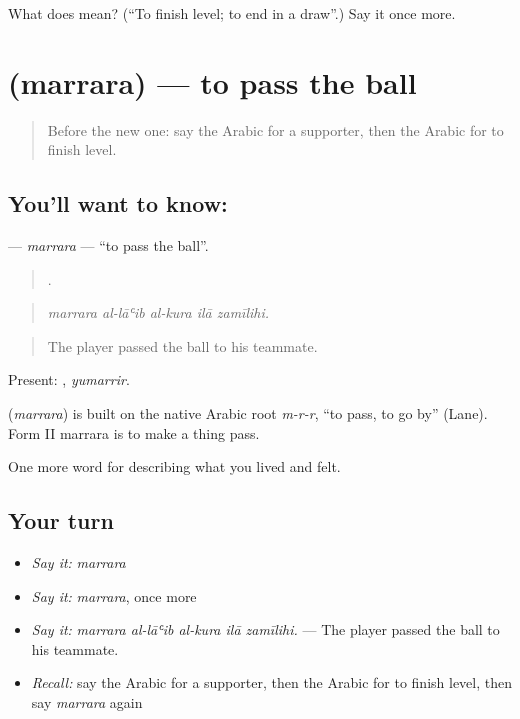 \begin{tcolorbox}[breakable,colback=teal!4,colframe=teal!35!black,title={Before you move on}]
What does  mean? (\textquotedblleft{}To finish level; to end in a draw\textquotedblright{}.) Say it once more.
\end{tcolorbox}
\section[\texorpdfstring{\ar{مرر} (marrara)}{مرر (marrara)}]{ (marrara) — to pass the ball}

\label{lesson:AR-C546-marrara}



\begin{quote}
Before the new one: say the Arabic for a supporter, then the Arabic for to finish level.
\end{quote}

\subsection*{You'll want to know: }
\textbf{} — \emph{marrara} — \textquotedblleft{}to pass the ball\textquotedblright{}.

\begin{quote}
    .
\end{quote}

\begin{quote}
\emph{marrara al-lāʿib al-kura ilā zamīlihi.}
\end{quote}

\begin{quote}
The player passed the ball to his teammate.
\end{quote}

Present: , \emph{yumarrir}.

\begin{cousinweb}
\textbf{} (\emph{marrara}) is built on the native Arabic root \emph{m-r-r}, \textquotedblleft{}to pass, to go by\textquotedblright{} (Lane). Form II marrara is to make a thing pass.
\end{cousinweb}

\begin{grammarlens}[title={What you've built}]
One more word for describing what you lived and felt.
\end{grammarlens}

\subsection*{Your turn}
\begin{itemize}
\raggedright
  \item \emph{Say it:} \emph{marrara}
  \item \emph{Say it:} \emph{marrara}, once more
  \item \emph{Say it:} \emph{marrara al-lāʿib al-kura ilā zamīlihi.} — The player passed the ball to his teammate.
  \item \emph{Recall:} say the Arabic for a supporter, then the Arabic for to finish level, then say \emph{marrara} again
\end{itemize}

